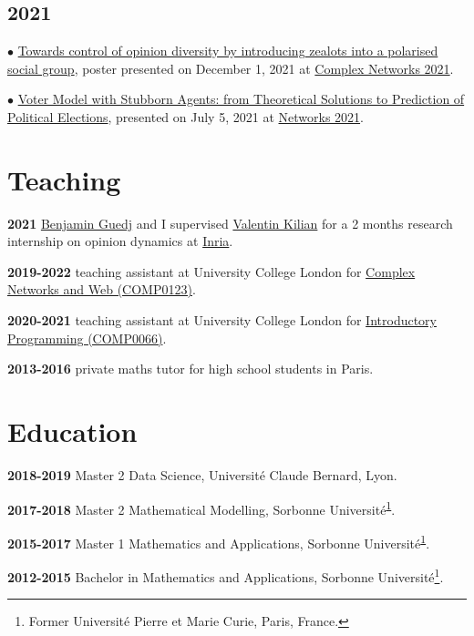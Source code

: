 \documentclass[a4paper,10pt]{article}
\begin{document}
\subsection*{2021}
$\bullet$ \href{https://antoinevendeville.github.io/files/poster_complexnet21.pdf}{Towards control of opinion diversity by introducing zealots into a polarised social group}, poster presented on December 1, 2021 at \href{https://complexnetworks.org/}{Complex Networks 2021}.

$\bullet$ \href{https://antoinevendeville.github.io/files/talk_networks21.pdf}{Voter Model with Stubborn Agents: from Theoretical Solutions to Prediction of Political Elections}, presented on July 5, 2021 at \href{https://networks2021.net/}{Networks 2021}.

\section*{Teaching}
\textbf{2021} \href{https://bguedj.github.io/}{Benjamin Guedj} and I supervised \href{https://valentinkil.github.io/}{Valentin Kilian} for a 2 months research internship on opinion dynamics at \href{https://www.inria.fr/en}{Inria}.

\textbf{2019-2022} teaching assistant at University College London for \href{https://www.ucl.ac.uk/module-catalogue/modules/complex-networks-and-web/COMP0123}{Complex Networks and Web (COMP0123)}.

\textbf{2020-2021} teaching assistant at University College London for \href{https://www.ucl.ac.uk/module-catalogue/modules/introductory-programming/COMP0066}{Introductory Programming (COMP0066)}.

\textbf{2013-2016} private maths tutor for high school students in Paris.

\section*{Education}
\textbf{2018-2019} Master 2 Data Science, Université Claude Bernard, Lyon.

\textbf{2017-2018} Master 2 Mathematical Modelling, Sorbonne Université\textsuperscript{\ref{note1}}.

\textbf{2015-2017} Master 1 Mathematics and Applications, Sorbonne Université\textsuperscript{\ref{note1}}.

\textbf{2012-2015} Bachelor in Mathematics and Applications, Sorbonne Université\footnote{\label{note1}Former Université Pierre et Marie Curie, Paris, France.}.
\end{document}
